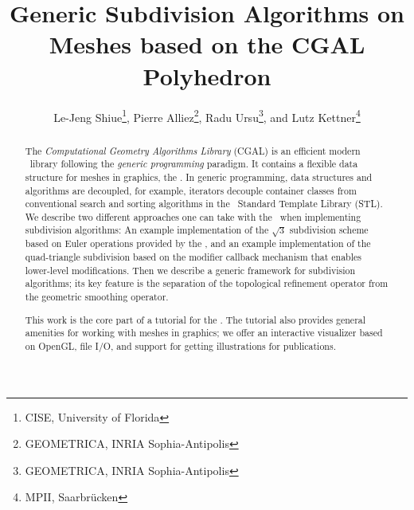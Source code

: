 \documentclass{egpubl}
\title{Generic Subdivision Algorithms on Meshes based on the CGAL Polyhedron}
\author[Le-Jeng Shiue, Pierre Alliez, Radu Ursu, and Lutz Kettner]
       {Le-Jeng Shiue\thanks{CISE, University of Florida},
        Pierre Alliez\thanks{GEOMETRICA, INRIA Sophia-Antipolis},
        Radu Ursu\thanks{GEOMETRICA, INRIA Sophia-Antipolis}, and
        Lutz Kettner\thanks{MPII, Saarbr\"ucken}
       }
\begin{document}
\maketitle

\begin{abstract}
  The \emph{Computational Geometry Algorithms Library\/} (CGAL) is an
  efficient modern \CC\ library following the \emph{generic
    programming\/} paradigm. It contains a flexible data structure for
  meshes in graphics, the \cgalpoly. In generic programming, data
  structures and algorithms are decoupled, for example, iterators
  decouple container classes from conventional search and sorting
  algorithms in the \CC\ Standard Template Library (STL). We describe
  two different approaches one can take with the \cgalpoly\ when
  implementing subdivision algorithms: An example implementation of
  the $\sqrt{3}$ subdivision scheme based on Euler operations provided
  by the \cgalpoly, and an example implementation of the quad-triangle
  subdivision based on the modifier callback mechanism that enables
  lower-level modifications. Then we describe a generic framework for
  subdivision algorithms; its key feature is the separation of the
  topological refinement operator from the geometric smoothing
  operator.

  This work is the core part of a tutorial for the \cgalpoly. The
  tutorial also provides general amenities for working with meshes in
  graphics; we offer an interactive visualizer based on OpenGL, file
  I/O, and support for getting illustrations for publications.



  \begin{classification} %
  \end{classification}

\end{abstract}
\end{document}
